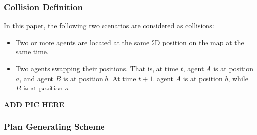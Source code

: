 \subsubsection{Collision Definition}
In this paper, the following two scenarios are considered as collisions:
\begin{itemize}
    \item Two or more agents are located at the same 2D position on the map at the same time.
    \item Two agents swapping their positions. That is, at time $t$, agent $A$ is at position $a$, and agent $B$ is at position $b$. At time $t+1$, agent $A$ is at position $b$, while $B$ is at position $a$.
\end{itemize}

\textbf{ADD PIC HERE} %


\subsubsection{Plan Generating Scheme}

